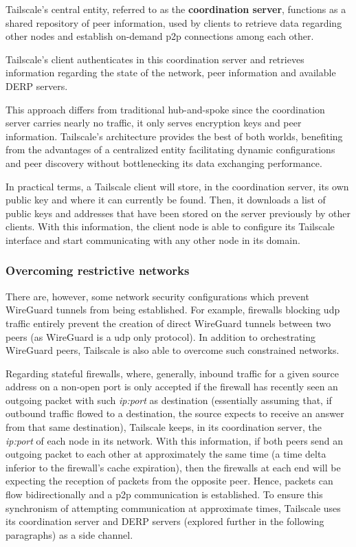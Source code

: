 \documentclass[11pt,twoside,a4paper]{report}
\begin{document}
Tailscale's central entity, referred to as the \textbf{coordination server}, functions as a shared repository of peer information, used by clients to retrieve data regarding other nodes and establish on-demand \ac{p2p} connections among each other.

Tailscale's client authenticates in this coordination server and retrieves information regarding the state of the network, peer information and available \ac{DERP} servers.

This approach differs from traditional hub-and-spoke since the coordination server carries nearly no traffic, it only serves encryption keys and peer information. Tailscale's architecture provides the best of both worlds, benefiting from the advantages of a centralized entity facilitating dynamic configurations and peer discovery without bottlenecking its data exchanging performance.

In practical terms, a Tailscale client will store, in the coordination server, its own public key and where it can currently be found. Then, it downloads a list of public keys and addresses that have been stored on the server previously by other clients. With this information, the client node is able to configure its Tailscale interface and start communicating with any other node in its domain.

\subsubsection{Overcoming restrictive networks}
\label{ssec:tsnetworks}

There are, however, some network security configurations which prevent WireGuard tunnels from being established. For example, firewalls blocking \ac{udp} traffic entirely prevent the creation of direct WireGuard tunnels between two peers (as WireGuard is a \ac{udp} only protocol). In addition to orchestrating WireGuard peers, Tailscale is also able to overcome such constrained networks.

Regarding stateful firewalls, where, generally, inbound traffic for a given source address on a non-open port is only accepted if the firewall has recently seen an outgoing packet with such \emph{ip:port} as destination (essentially assuming that, if outbound traffic flowed to a destination, the source expects to receive an answer from that same destination), Tailscale keeps, in its coordination server, the \emph{ip:port} of each node in its network. With this information, if both peers send an outgoing packet to each other at approximately the same time (a time delta inferior to the firewall's cache expiration), then the firewalls at each end will be expecting the reception of packets from the opposite peer. Hence, packets can flow bidirectionally and a \ac{p2p} communication is established. To ensure this synchronism of attempting communication at approximate times, Tailscale uses its coordination server and \ac{DERP} servers (explored further in the following paragraphs) as a side channel.
\end{document}
